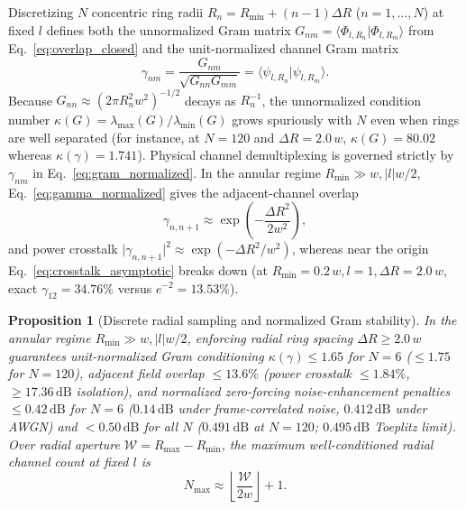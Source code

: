 \documentclass[aps,pra,reprint,amsmath,amssymb,floatfix,longbibliography]{revtex4-2}
\providecommand{\braket}[2]{\langle#1\vert#2\rangle}
\providecommand{\abs}[1]{\lvert#1\rvert}
\newtheorem{proposition}{Proposition}
\begin{document}
Discretizing $N$ concentric ring radii $R_n = R_{\min} + (n-1)\Delta R$ ($n = 1,\dots,N$) at fixed $l$ defines both the unnormalized Gram matrix $G_{nm} = \braket{\Phi_{l,R_n}}{\Phi_{l,R_m}}$ from Eq.~\eqref{eq:overlap_closed} and the unit-normalized channel Gram matrix
\begin{equation}
\gamma_{nm} = \frac{G_{nm}}{\sqrt{G_{nn} G_{mm}}} = \braket{\psi_{l,R_n}}{\psi_{l,R_m}}.
\label{eq:gram_normalized}
\end{equation}
Because $G_{nn} \approx (2\pi R_n^2 w^2)^{-1/2}$ decays as $R_n^{-1}$, the unnormalized condition number $\kappa(G) = \lambda_{\max}(G)/\lambda_{\min}(G)$ grows spuriously with $N$ even when rings are well separated (for instance, at $N = 120$ and $\Delta R = 2.0\,w$, $\kappa(G) = 80.02$ whereas $\kappa(\gamma) = 1.741$). Physical channel demultiplexing is governed strictly by $\gamma_{nm}$ in Eq.~\eqref{eq:gram_normalized}. In the annular regime $R_{\min} \gg w, \abs{l}w/2$, Eq.~\eqref{eq:gamma_normalized} gives the adjacent-channel overlap
\begin{equation}
\gamma_{n,n+1} \approx \exp\!\left(-\frac{\Delta R^2}{2w^2}\right),
\label{eq:crosstalk_asymptotic}
\end{equation}
and power crosstalk $\abs{\gamma_{n,n+1}}^2 \approx \exp(-\Delta R^2/w^2)$, whereas near the origin Eq.~\eqref{eq:crosstalk_asymptotic} breaks down (at $R_{\min} = 0.2\,w, l = 1, \Delta R = 2.0\,w$, exact $\gamma_{12} = 34.76\%$ versus $e^{-2} = 13.53\%$).

\begin{proposition}[Discrete radial sampling and normalized Gram stability]
\label{prop:channel_capacity}
In the annular regime $R_{\min} \gg w, \abs{l}w/2$, enforcing radial ring spacing $\Delta R \ge 2.0\,w$ guarantees unit-normalized Gram conditioning $\kappa(\gamma) \le 1.65$ for $N = 6$ ($\le 1.75$ for $N = 120$), adjacent field overlap $\le 13.6\%$ (power crosstalk $\le 1.84\%$, $\ge 17.36\,\mathrm{dB}$ isolation), and normalized zero-forcing noise-enhancement penalties $\le 0.42\,\mathrm{dB}$ for $N = 6$ ($0.14\,\mathrm{dB}$ under frame-correlated noise, $0.412\,\mathrm{dB}$ under AWGN) and $< 0.50\,\mathrm{dB}$ for all $N$ ($0.491\,\mathrm{dB}$ at $N = 120$; $0.495\,\mathrm{dB}$ Toeplitz limit). Over radial aperture $\mathcal{W} = R_{\max} - R_{\min}$, the maximum well-conditioned radial channel count at fixed $l$ is
\begin{equation}
N_{\max} \approx \left\lfloor \frac{\mathcal{W}}{2w} \right\rfloor + 1.
\label{eq:channel_capacity}
\end{equation}
\end{proposition}
\end{document}
